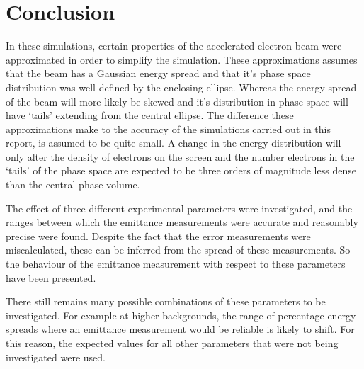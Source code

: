 
\section{Conclusion}
\label{sec:conclusion}

In these simulations, certain properties of the accelerated electron beam were
approximated in order to simplify the simulation. These approximations assumes
that the beam has a Gaussian energy spread and that it's phase space
distribution was well defined by the enclosing ellipse. Whereas the energy
spread of the beam will more likely be skewed and it's distribution in phase
space will have `tails' extending from the central ellipse. The difference these
approximations make to the accuracy of the simulations carried out in this
report, is assumed to be quite small.  A change in the energy distribution will
only alter the density of electrons on the screen and the number electrons in
the `tails' of the phase space are expected to be three orders of magnitude less
dense than the central phase volume.

The effect of three different experimental parameters were investigated, and
the ranges between which the emittance measurements were accurate and reasonably
precise were found. Despite the fact that the error measurements were
miscalculated, these can be inferred from the spread of these measurements.
So the behaviour of the emittance measurement with respect to these parameters
have been presented.

There still remains many possible combinations of these parameters to be
investigated. For example at higher backgrounds, the range of percentage energy
spreads where an emittance measurement would be reliable is likely to shift. For
this reason, the expected values for all other parameters that were not being
investigated were used.

